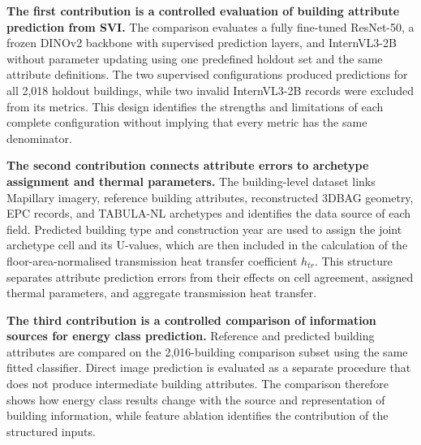 \textbf{The first contribution is a controlled evaluation of building attribute prediction from SVI.}
The comparison evaluates a fully fine-tuned ResNet-50, a frozen DINOv2 backbone with supervised prediction layers, and InternVL3-2B without parameter updating using one predefined holdout set and the same attribute definitions.
The two supervised configurations produced predictions for all 2,018 holdout buildings, while two invalid InternVL3-2B records were excluded from its metrics. This design identifies the strengths and limitations of each complete configuration without implying that every metric has the same denominator.

\textbf{The second contribution connects attribute errors to archetype assignment and thermal parameters.}
The building-level dataset links Mapillary imagery, reference building attributes, reconstructed 3DBAG geometry, \ac{EPC} records, and TABULA-NL archetypes and identifies the data source of each field.
Predicted building type and construction year are used to assign the joint archetype cell and its U-values, which are then included in the calculation of the floor-area-normalised transmission heat transfer coefficient $h_{tr}$.
This structure separates attribute prediction errors from their effects on cell agreement, assigned thermal parameters, and aggregate transmission heat transfer.

\textbf{The third contribution is a controlled comparison of information sources for energy class prediction.}
Reference and predicted building attributes are compared on the 2,016-building comparison subset using the same fitted classifier.
Direct image prediction is evaluated as a separate procedure that does not produce intermediate building attributes.
The comparison therefore shows how energy class results change with the source and representation of building information, while feature ablation identifies the contribution of the structured inputs.

